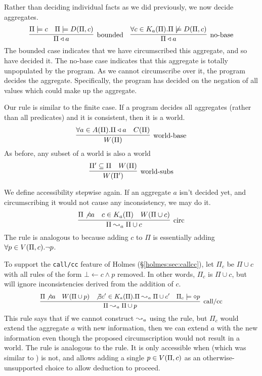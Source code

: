 Rather than deciding individual facts as we did previously, we now decide aggregates.
\[
	\infer[\textrm{bounded}]{\Pi \decides a}{\Pi \models c & \Pi \models \decirc{\Pi}{c}}
	\quad
	\infer[\textrm{no-base}]{\Pi \decides a}{\forall c \in \circset_a(\Pi). \Pi \not \models \decirc{\Pi}{c}}
\]
The bounded case indicates that we have circumscribed this aggregate, and so have decided it.
The no-base case indicates that this aggregate is totally unpopulated by the program.
As we cannot circumscribe over it, the program decides the aggregate.
Specifically, the program has decided on the negation of all values which could make up the aggregate.

Our  rule is similar to the finite case.
If a program decides all aggregates (rather than all predicates) and it is consistent, then it is a world.
\[
	\infer[\textrm{world-base}]{\world{\Pi}}{\forall a \in \aggset(\Pi). \Pi \decides a & C(\Pi)}
\]
As before, any subset of a world is also a world
\[
	\infer[\textrm{world-subs}]{\world{\Pi'}}{\Pi' \subseteq \Pi & \world{\Pi}}
\]

We define accessibility stepwise again.
If an aggregate $a$ isn't decided yet, and circumscribing it would not cause any inconsistency, we may do it.
\[
	\infer[\textrm{circ}]{\Pi \stepass_a \Pi \cup c}{\Pi \not \decides a & c \in \circset_a(\Pi) & W(\Pi \cup c)}
\]
The  rule is analogous to  because adding $c$ to $\Pi$ is essentially adding $\forall p \in V(\Pi, c). \neg p$.

To support the \texttt{call/cc} feature of Holmes (\S \ref{holmes:sec:callcc}), let $\Pi_c$ be $\Pi \cup c$ with all rules of the form $\bot \leftarrow c \wedge p$ removed.
In other words, $\Pi_c$ is $\Pi \cup c$, but will ignore inconsistencies derived from the addition of $c$.
\[\small
	\infer[\textrm{call/cc}]{\Pi \stepass_a \Pi \cup p}{\Pi \not \decides a & \world{\Pi \cup p} & \not \exists c' \in \circset_a(\Pi). \Pi \stepass_a \Pi \cup c' & \Pi_c \models \dia p}
\]
This rule says that if we cannot construct $\leadsto_a$ using the  rule, but $\Pi_c$ would extend the aggregate $a$ with new information, then we can extend $a$ with the new information even though the proposed circumscription would not result in a world.
The  rule is analogous to the  rule.
It is only accessible when  (which was similar to ) is not, and allows adding a single $p \in V(\Pi, c)$ as an otherwise-unsupported choice to allow deduction to proceed.

